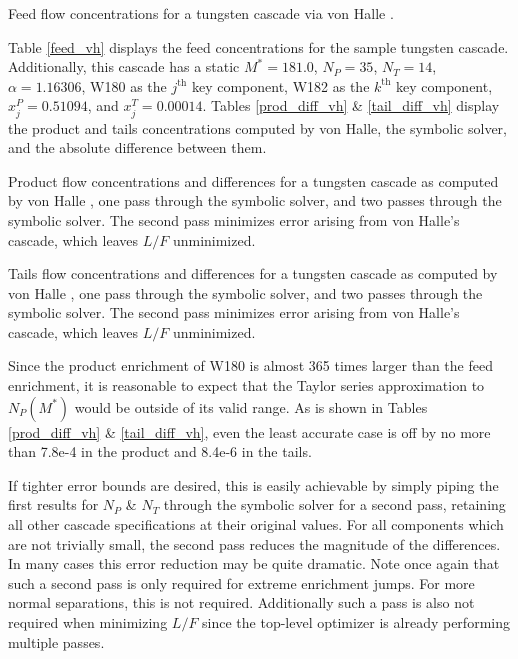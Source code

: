 \documentclass[preprint,12pt]{elsarticle}
\newcommand{\nuc}[2]{{#1}{#2}}
\newcommand{\jth}[0]{$j^{\mbox{th}}$ }
\newcommand{\kth}[0]{$k^{\mbox{th}}$ }
\begin{document}
\begin{table}[htbp]
\begin{center}
\caption{Feed flow concentrations for a tungsten cascade via von Halle 
    \cite{VonHalle1987}.}

\label{feed_vh}
\end{center}
\end{table}

Table \ref{feed_vh} displays the feed concentrations for the sample tungsten cascade.
Additionally, this cascade has a static $M^*=181.0$, $N_P=35$, $N_T=14$,
$\alpha=1.16306$, \nuc{W}{180} as the \jth key component, \nuc{W}{182} as the \kth
key component, $x_j^P=0.51094$, and $x_j^T=0.00014$.  Tables \ref{prod_diff_vh} \&
\ref{tail_diff_vh} display the product and tails concentrations computed by von Halle, 
the symbolic solver, and the absolute difference between them.

\begin{table}[htbp]
\begin{center}
\caption{Product flow concentrations and differences for a tungsten cascade as 
computed by  von Halle \cite{VonHalle1987}, one pass through the symbolic solver, 
and two passes through the symbolic solver.  The second pass minimizes error arising
from von Halle's cascade, which leaves $L/F$ unminimized.}

\label{prod_diff_vh}
\end{center}
\end{table}


\begin{table}[htbp]
\begin{center}
\caption{Tails flow concentrations and differences for a tungsten cascade as 
computed by  von Halle \cite{VonHalle1987}, one pass through the symbolic solver, 
and two passes through the symbolic solver.  The second pass minimizes error arising 
from von Halle's cascade, which leaves $L/F$ unminimized.}

\label{tail_diff_vh}
\end{center}
\end{table}

Since the product enrichment of \nuc{W}{180} is almost 365 times larger than the feed
enrichment, it is reasonable to expect that the Taylor series approximation to 
$N_P(M^*)$ would be outside of its valid range.  
As is shown in Tables \ref{prod_diff_vh} \& \ref{tail_diff_vh},  
even the least accurate case is off by no more than 7.8e-4 in the product and 
8.4e-6 in the tails.  

If tighter error bounds are desired, this is easily achievable by simply piping
the first results for $N_P$ \& $N_T$ through the symbolic solver for a second pass, 
retaining all other cascade specifications at their original values.  For all 
components which are not trivially small, the second pass reduces the magnitude of the 
differences.  In many cases this error reduction may be quite dramatic. Note once 
again that such a second 
pass is only required for extreme enrichment jumps.  For more normal separations, 
this is not required.  Additionally such a pass is also not required when minimizing
$L/F$ since the top-level optimizer is already performing multiple passes.
\end{document}
